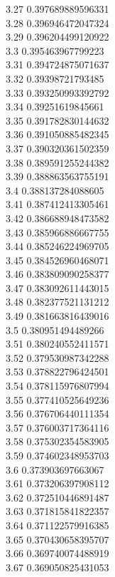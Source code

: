 {3.27	0.397689889596331\\
3.28	0.396946472047324\\
3.29	0.396204499120922\\
3.3	0.395463967799223\\
3.31	0.394724875071637\\
3.32	0.39398721793485\\
3.33	0.393250993392792\\
3.34	0.39251619845661\\
3.35	0.391782830144632\\
3.36	0.391050885482345\\
3.37	0.390320361502359\\
3.38	0.389591255244382\\
3.39	0.388863563755191\\
3.4	0.388137284088605\\
3.41	0.387412413305461\\
3.42	0.386688948473582\\
3.43	0.385966886667755\\
3.44	0.385246224969705\\
3.45	0.384526960468071\\
3.46	0.383809090258377\\
3.47	0.383092611443015\\
3.48	0.382377521131212\\
3.49	0.381663816439016\\
3.5	0.380951494489266\\
3.51	0.380240552411571\\
3.52	0.379530987342288\\
3.53	0.378822796424501\\
3.54	0.378115976807994\\
3.55	0.377410525649236\\
3.56	0.376706440111354\\
3.57	0.376003717364116\\
3.58	0.375302354583905\\
3.59	0.374602348953703\\
3.6	0.373903697663067\\
3.61	0.373206397908112\\
3.62	0.372510446891487\\
3.63	0.371815841822357\\
3.64	0.371122579916385\\
3.65	0.370430658395707\\
3.66	0.369740074488919\\
3.67	0.369050825431053\\
}
